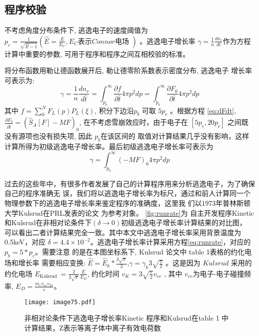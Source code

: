 \subsection{程序校验}
不考虑角度分布条件下, 逃逸电子的速度阈值为 $ p_{c}=\frac{1}{\sqrt{\hat{E}-1}}\left(\hat{E}=\frac{E}{E_{C}}, E_{C} \text{表示} Connor \text{电场 }\right)$  。逃逸电子增长率 $ \gamma=\frac{1}{n} \frac{d n_{r}}{d t}  $作为方程计算中重要的参数, 可用于程序和程序之间互相校验的标准。
   
将分布函数用勒让德函数展开后, 勒让德零阶系数表示密度分布, 逃逸电子 增长率可表示为:
\begin{equation}
\gamma=\frac{1}{n} \frac{d n_{r}}{d \hat{t}}=\int_{p_{b}}^{\infty} \frac{\partial f}{\partial \hat{t}} 4 \pi p^{2} d p=\int_{p_{b}}^{\infty} \frac{\partial F_{0}}{\partial \hat{t}} 4 \pi p^{2} d p
\end{equation}
其中  $f=\sum_{0}^{N} F_{L}(p) P_{L}(\xi) $, 积分下边沿$p_{b}$  可取 $ 5 p_{c}$ 。根据方程 \eqref{eq:dFdt}, $\frac{\partial F_{0}}{\partial \hat{t}}=\left(\hat{S}_{A}[F]-M F\right)_{0}$, 在不考虑雪崩效应时，由于电子在 $ \left[5 p_{c}, 20 p_{c}\right] $ 之间既没有源项也没有损失项, 因此 $ p_{b} $在该区间的 取值对计算结果几乎没有影响，这样计算所得为初级逃逸电子增长率。最后初级逃逸电子增长率可表示为
\begin{equation}\label{eq:runrate}
\gamma=\int_{p_{b}}^{\infty}\left(-M F\right)_{0} 4 \pi p^{2} d p
\end{equation}

过去的这些年中，有很多作者发展了自己的计算程序用来分析逃逸电子，为了确保自己的程序准确无
误，我们将以逃逸电子增长率为标尺，通过和前人计算同一个物理参数下的逃逸电子增长率来鉴定程序的准确度，这里我
们以1973年普林斯顿大学Kulsrud在PRL发表的论文\cite{RN2095}	为参考对象。 \autoref{fig:runrate}为
自主开发程序Kinetic和Kulsrud在非相对论条件下$(δ→0)$初级逃逸电子增长率计算结果的对比图，
可以看出二者计算结果完全一致。其中本文中逃逸电子增长率采用背景温度为0.5keV，对应
$δ=4.4×10^{-2}$。逃逸电子增长率计算采用方程\eqref{eq:runrate}，对应的$p_b=5*p_c$。需要注意
的是在本图坐标系下, Kulsrud 论文中 table  1表格的约化电场和增长率 需要相应变换: $ \hat{E}
=\hat{E}_{k} * \frac{3 \sqrt{\pi}}{2}$,$ \gamma=\gamma_{k} 3 \sqrt{\frac{\pi}{2}} $ 。这是因为 $ 
Kulsrud $ 采用的约化电场 $ E_{\text {Kulsrud }}=\frac{2}{3 \sqrt{\pi}} \frac{E}{E_{D}} $, 约化时间  
$v_{K}=3 \sqrt{\frac{\pi}{2}} v_{e e}$ , 其中  $v_{e e}  $为电子-电子碰撞频率,  $E_{D}=   \frac{m_{e} 
v_{e e} v_{T e}}{e}  $。
\begin{figure}[H]
\centering
\texttt{[image: image75.pdf]}
\caption{\label{fig:runrate}非相对论条件下逃逸电子增长率Kinetic 程序和Kulsrud在table 1\cite{RN2095}	中计算结果，Z表示等离子体中离子有效电荷数}
\end{figure}

